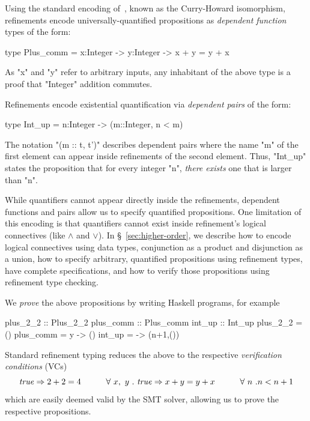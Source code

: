 %
Using the standard encoding of~\citet{CHIso},
known as the Curry-Howard isomorphism,
refinements encode universally-quantified propositions as
\emph{dependent function} types of the form:
%
\begin{mcode}
    type Plus_comm = x:Integer -> y:Integer -> { x + y = y + x }
\end{mcode}
%
As "x" and "y" refer to arbitrary inputs,
any inhabitant of the above type is a proof
that "Integer" addition commutes.
%

Refinements encode existential quantification via
\emph{dependent pairs} of the form:
%
\begin{mcode}
    type Int_up = n:Integer -> (m::Integer, {n < m})
\end{mcode}
%
The notation "(m :: t, t')" describes dependent pairs
where the name "m" of the first element can appear
inside refinements of the second element.
%
Thus, "Int_up" states the proposition that for
every integer "n", \emph{there exists}
one that is larger than "n".

While quantifiers cannot appear directly
inside the refinements, dependent functions and
pairs allow us to specify quantified propositions.
%
One limitation of this encoding is that quantifiers
cannot exist inside refinement's logical connectives (like $\land$ and $\lor$).
%
In \S~\ref{sec:higher-order}, we describe how to
encode logical connectives using data types,
\eg conjunction as a product and disjunction as
a union, how to specify arbitrary,
quantified propositions
using refinement types, \ie have complete specifications,
and how to verify those propositions using refinement
type checking.

%
We \emph{prove} the above propositions by
writing Haskell programs, for example
%
\begin{mcode}
    plus_2_2 :: Plus_2_2        plus_comm :: Plus_comm        int_up :: Int_up
    plus_2_2 = ()               plus_comm = \x y -> ()        int_up = \n -> (n+1,())
\end{mcode}
%
Standard refinement typing reduces the above to
the respective \emph{verification conditions} (VCs)
%
$$ \mathit{true} \Rightarrow 2 + 2 = 4 \quad \quad \quad
   \forall \ x,\ y\ .\ \mathit{true} \Rightarrow x + y = y + x \quad \quad \quad
   \forall \ n\ . n < n+1 $$
%
%
which are easily deemed valid by the SMT solver, allowing us
to prove the respective propositions.

